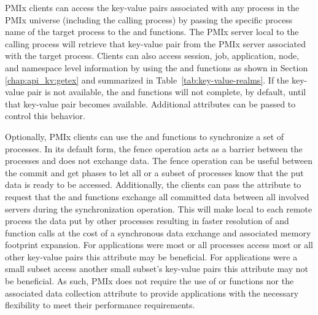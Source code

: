 \ac{PMIx} clients can access the key-value pairs associated with any process in the \ac{PMIx} universe (including the calling process) by passing the specific process name of the target process to the  and  functions.
The \ac{PMIx} server local to the calling process will retrieve that key-value pair from the \ac{PMIx} server associated with the target process.
Clients can also access session, job, application, node, and namespace level information by using the  and  functions as shown in Section \ref{chap:api_kv:getex} and summarized in Table~\ref{tab:key-value-realms}.
If the key-value pair is not available, the  and  functions will not complete, by default, until that key-value pair becomes available.
Additional attributes can be passed to control this behavior.

Optionally, \ac{PMIx} clients can use the  and  functions to synchronize a set of processes.
In its default form, the fence operation acts as a barrier between the processes and does not exchange data.
The fence operation can be useful between the commit and get phases to let all or a subset of processes know that the put data is ready to be accessed.
Additionally, the clients can pass the  attribute to request that the  and  functions exchange all committed data between all involved servers during the synchronization operation.
This will make local to each remote process the data put by other processes resulting in faster resolution of  and  function calls at the cost of a synchronous data exchange and associated memory footprint expansion.
For applications were most or all processes access most or all other key-value pairs this attribute may be beneficial.
For applications were a small subset access another small subset's key-value pairs this attribute may not be beneficial.
As such, \ac{PMIx} does not require the use of  or  functions nor the associated data collection attribute to provide applications with the necessary flexibility to meet their performance requirements.




